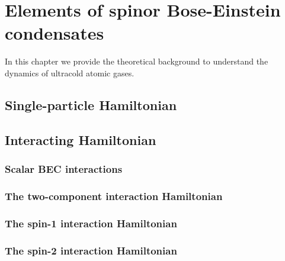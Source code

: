 \chapter{Elements of spinor Bose-Einstein condensates}

In this chapter we provide the theoretical background to understand the 
dynamics of ultracold atomic gases.


\section{Single-particle Hamiltonian}

\section{Interacting Hamiltonian}

\subsection{Scalar BEC interactions}

\subsection{The two-component interaction Hamiltonian}

\subsection{The spin-1 interaction Hamiltonian}

\subsection{The spin-2 interaction Hamiltonian}
